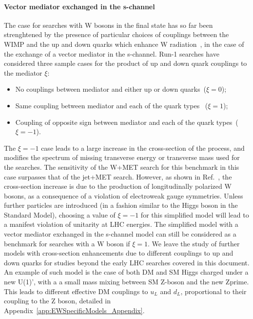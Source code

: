 
\paragraph{Vector mediator exchanged in the s-channel}

The case for searches with W bosons in the final state has so far been strenghtened by the
presence of particular choices of couplings between the WIMP and the up and
down quarks which enhance W radiation~\cite{Bai:2012xg}, in the case of the exchange
of a vector mediator in the s-channel.
Run-1 searches have considered three sample cases for the product of
up and down quark couplings to the mediator $\xi$:
\begin{itemize}
 \item No couplings between mediator and either up or down quarks~($\xi=0$);
 \item Same coupling between mediator and each of the quark types~ ($\xi=1$);
 \item Coupling of opposite sign between mediator and each of the quark types~($\xi=-1$).
\end{itemize}
The $\xi=-1$ case leads to a large increase in the cross-section of the process,
and modifies the spectrum of missing transverse energy or
transverse mass used for the searches. The sensitivity of the W+MET search for
this benchmark in this case surpasses that of the jet+MET search.
However, as shown in Ref.~\cite{Bell:2015sza}, the cross-section increase is due
to the production of longitudinally polarized W bosons,
as a consequence of a violation of electroweak gauge symmetries. Unless further
particles are introduced (in a fashion similar
to the Higgs boson in the Standard Model), choosing a value of $\xi=-1$
for this simplified model will lead to a manifest violation of unitarity at LHC energies.
The simplified model with a vector mediator exchanged in the s-channel model
can still be considered as a benchmark for searches with a W boson if $\xi=1$.
We leave the study of further models with cross-section enhancements due
to different couplings to up and down quarks for studies beyond the early LHC searches
covered in this document.
An example of such model is the case of both DM and SM Higgs charged under a new U(1)',
with a a small mass mixing between SM Z-boson and the new Zprime. This leads
to different effective DM couplings to $u_L$ and $d_L$, proportional to
their coupling to the Z boson, detailed in Appendix~\ref{app:EWSpecificModels_Appendix}.

